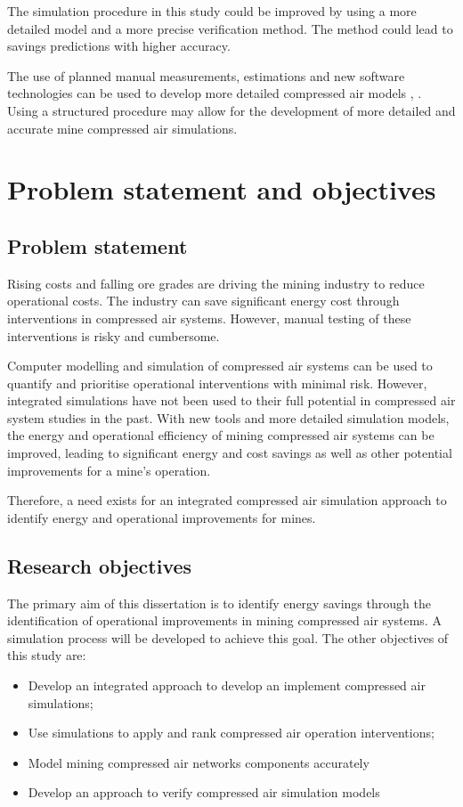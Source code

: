 		\par 
		 The simulation procedure in this study could be improved by using a more detailed model and a more precise verification method. The method could lead to savings predictions with higher accuracy. 
		\par
		The use of planned manual measurements, estimations and new software technologies can be used to develop more detailed compressed air models \cite{Bredenkamp2015Challeges}, \cite{Mare2017Evaluating}. Using a structured procedure may allow for the development of more detailed and accurate mine compressed air simulations.
		

\section{Problem statement and objectives}
	\subsection{Problem statement}
 		Rising costs and falling ore grades are driving the mining industry to reduce operational costs. The industry can save significant energy cost through interventions in compressed air systems. However, manual testing of these interventions is risky and cumbersome.
 		\par
 		Computer modelling and simulation of compressed air systems can be used to quantify and prioritise operational interventions with minimal risk. However, integrated simulations have not been used to their full potential in compressed air system studies in the past. With new tools and more detailed simulation models, the energy and operational efficiency of mining compressed air systems can be improved, leading to significant energy and cost savings as well as other potential improvements for a mine's operation.
 		\par 
 		Therefore, a need exists for an integrated compressed air simulation approach to identify energy and operational improvements for mines.
 			\subsection{Research objectives}
 			
		The primary aim of this dissertation is to identify energy savings through the identification of operational improvements in mining compressed air systems. A simulation process will be developed to achieve this goal. The other objectives of  this study are:
		\begin{itemize}
			\item Develop an integrated approach to develop an implement compressed air simulations;
			\item Use simulations to apply and rank compressed air operation interventions;
			\item Model mining compressed air networks components accurately
			\item Develop an approach to verify compressed air simulation models
		\end{itemize}
		
